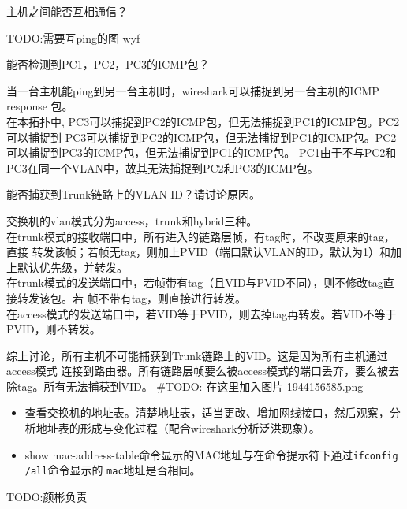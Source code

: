 \documentclass{myreport}
\begin{document}
\begin{tcolorbox}[title = {观察一}]
主机之间能否互相通信？
\end{tcolorbox}
TODO:需要互ping的图
wyf
\begin{tcolorbox}[title = {观察二}]
    能否检测到PC1，PC2，PC3的ICMP包？
\end{tcolorbox}
当一台主机能ping到另一台主机时，wireshark可以捕捉到另一台主机的ICMP response 包。\\ 
在本拓扑中, PC3可以捕捉到PC2的ICMP包，但无法捕捉到PC1的ICMP包。PC2可以捕捉到
PC3可以捕捉到PC2的ICMP包，但无法捕捉到PC1的ICMP包。PC2可以捕捉到PC3的ICMP包，但无法捕捉到PC1的ICMP包。
PC1由于不与PC2和PC3在同一个VLAN中，故其无法捕捉到PC2和PC3的ICMP包。

\begin{tcolorbox}[title = {观察三}]
能否捕获到Trunk链路上的VLAN ID？请讨论原因。
\end{tcolorbox}
交换机的vlan模式分为access，trunk和hybrid三种。\\
在trunk模式的接收端口中，所有进入的链路层帧，有tag时，不改变原来的tag，直接
转发该帧；若帧无tag，则加上PVID（端口默认VLAN的ID，默认为1）和加上默认优先级，并转发。\\
在trunk模式的发送端口中，若帧带有tag（且VID与PVID不同），则不修改tag直接转发该包。若
帧不带有tag，则直接进行转发。\\ 

在access模式的发送端口中，若VID等于PVID，则去掉tag再转发。若VID不等于PVID，则不转发。

综上讨论，所有主机不可能捕获到Trunk链路上的VID。这是因为所有主机通过access模式
连接到路由器。所有链路层帧要么被access模式的端口丢弃，要么被去除tag。所有无法捕获到VID。
#TODO: 在这里加入图片 1944156585.png
\begin{tcolorbox}[title = {观察四}]
    
    \begin{itemize}
        \item 查看交换机的地址表。清楚地址表，适当更改、增加网线接口，然后观察，分析地址表的形成与变化过程（配合wireshark分析泛洪现象）。
        \item show mac-address-table命令显示的MAC地址与在命令提示符下通过\texttt{ifconfig /all}命令显示的 \texttt{mac}地址是否相同。
    \end{itemize}
    
\end{tcolorbox}
TODO:颜彬负责
\end{document}
